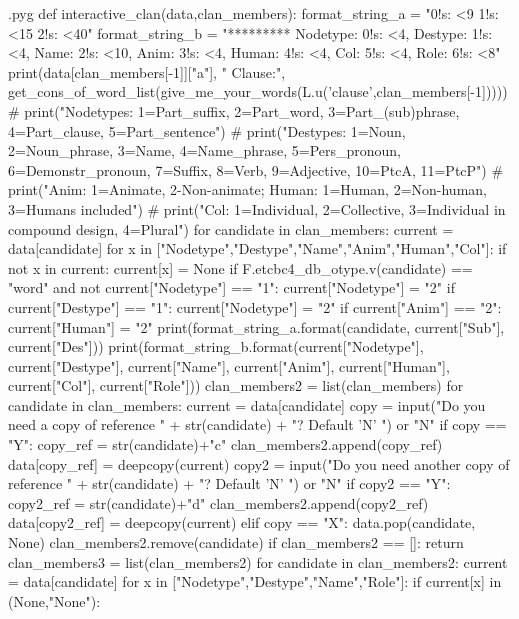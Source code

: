 \documentclass{report}
\makeatletter
\newenvironment{python}{%
  \VerbatimEnvironment
  \minted@resetoptions
  \setkeys{minted@opt}{}
      \begin{VerbatimOut}{\jobname.pyg}}
{%
      \end{VerbatimOut}
      \minted@pygmentize{python}
      \DeleteFile{\jobname.pyg}}
\makeatother
\begin{document}
\begin{python}
def interactive_clan(data,clan_members):
    format_string_a = "{0!s: <9} {1!s: <15} {2!s: <40}"
    format_string_b = "********* Nodetype: {0!s: <4}, Destype: {1!s: <4}, Name: {2!s: <10}, Anim: {3!s: <4}, Human: {4!s: <4}, Col: {5!s: <4}, Role: {6!s: <8}"
    print(data[clan_members[-1]]["a"], " Clause:", get_cons_of_word_list(give_me_your_words(L.u('clause',clan_members[-1]))))
#    print("Nodetypes: 1=Part_suffix, 2=Part_word, 3=Part_(sub)phrase, 4=Part_clause, 5=Part_sentence")
#    print("Destypes: 1=Noun, 2=Noun_phrase, 3=Name, 4=Name_phrase, 5=Pers_pronoun, 6=Demonstr_pronoun, 7=Suffix, 8=Verb, 9=Adjective, 10=PtcA, 11=PtcP")
#    print("Anim: 1=Animate, 2-Non-animate; Human: 1=Human, 2=Non-human, 3=Humans included")
#    print("Col: 1=Individual, 2=Collective, 3=Individual in compound design, 4=Plural")
    for candidate in clan_members:
        current = data[candidate]
        for x in ["Nodetype","Destype","Name","Anim","Human","Col"]:
            if not x in current:
                current[x] = None
        if F.etcbc4_db_otype.v(candidate) == "word" and not current["Nodetype"] == "1":
            current["Nodetype"] = "2"
        if current["Destype"] == "1":
            current["Nodetype"] = "2"
        if current["Anim"] == "2":
            current["Human"] = "2"
        print(format_string_a.format(candidate, current["Sub"], current["Des"]))
        print(format_string_b.format(current["Nodetype"], current["Destype"], current["Name"], current["Anim"], current["Human"], current["Col"], current["Role"]))
    clan_members2 = list(clan_members)
    for candidate in clan_members:
        current = data[candidate]
        copy = input("Do you need a copy of reference " + str(candidate) + "? Default 'N' ") or "N"
        if copy == "Y":
            copy_ref = str(candidate)+"c"
            clan_members2.append(copy_ref)
            data[copy_ref] = deepcopy(current)
            copy2 = input("Do you need another copy of reference " + str(candidate) + "? Default 'N' ") or "N"
            if copy2 == "Y":
                copy2_ref = str(candidate)+"d"
                clan_members2.append(copy2_ref)
                data[copy2_ref] = deepcopy(current)
        elif copy == "X":
            data.pop(candidate, None)
            clan_members2.remove(candidate)
            if clan_members2 == []:
                return
    clan_members3 = list(clan_members2)
    for candidate in clan_members2:
        current = data[candidate]
        for x in ["Nodetype","Destype","Name","Role"]:
            if current[x] in (None,"None"):

\end{python}
\end{document}
